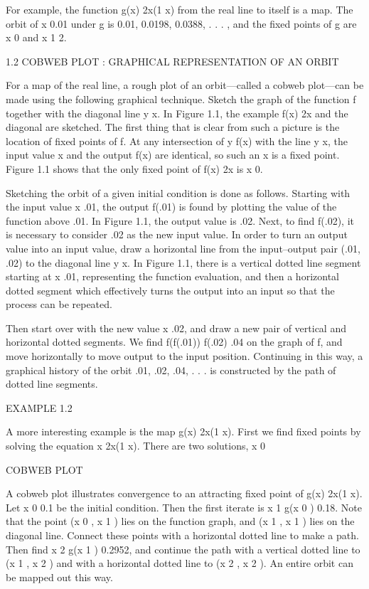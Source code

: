 \documentclass[12pt]{article}
\begin{document}
For example, the function g(x)  2x(1  x) from the real line to itself is a map. The orbit of x  0.01 under 
g is 0.01, 0.0198, 0.0388, . . .  , and the ﬁxed points of g are x  0 and x  1  2.

1.2 COBWEB PLOT : GRAPHICAL REPRESENTATION OF AN ORBIT

For a map of the real line, a rough plot of an orbit—called a cobweb plot—can be made using the following 
graphical technique. Sketch the graph of the function f together with the diagonal line y  x. In Figure 
1.1, the example f(x)  2x and the diagonal are sketched. The ﬁrst thing that is clear from such a picture 
is the location of ﬁxed points of f. At any intersection of y  f(x) with the line y  x,
the input value x and the output f(x) are identical, so such an x is a ﬁxed point. Figure 1.1 shows that 
the only ﬁxed point of f(x)  2x is x  0.

Sketching the orbit of a given initial condition is done as follows. Starting with the input value x  .01, 
the output f(.01) is found by plotting the value of the function above .01. In Figure 1.1, the output value 
is .02. Next, to ﬁnd f(.02), it is necessary to consider .02 as the new input value. In order to turn an 
output value into an input value, draw a horizontal line from the input–output pair (.01, .02) to the 
diagonal line y  x. In Figure 1.1, there is a vertical dotted line segment starting at x  .01, representing 
the function evaluation, and then a horizontal dotted segment which effectively turns the output into an 
input so that the process can be repeated.

Then start over with the new value x  .02, and draw a new pair of vertical and horizontal dotted segments. 
We ﬁnd f(f(.01))  f(.02)  .04 on the graph of f, and move horizontally to move output to the input 
position. Continuing in this way, a graphical history of the orbit .01, .02, .04, . . .  is constructed by 
the path of dotted line segments.

EXAMPLE 1.2

A more interesting example is the map g(x)  2x(1  x). First we ﬁnd ﬁxed points by solving the equation x  
2x(1  x). There are two solutions, x  0

COBWEB PLOT

A cobweb plot illustrates convergence to an attracting ﬁxed point of g(x)  2x(1  x). Let x 0  0.1 be the 
initial condition. Then the ﬁrst iterate is x 1  g(x 0 )  0.18. Note that the point (x 0 , x 1 ) lies on 
the function graph, and (x 1 , x 1 ) lies on the diagonal line. Connect these points with a horizontal 
dotted line to make a path. Then ﬁnd x 2  g(x 1 )  0.2952, and continue the path with a vertical dotted 
line to (x 1 , x 2 ) and with a horizontal dotted line to (x 2 , x 2 ). An entire orbit can be mapped out 
this way.
\end{document}
